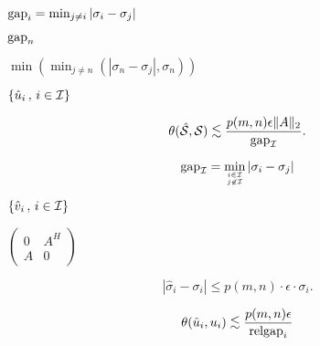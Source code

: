 {\newpage\clearpage
{}%
${\rm gap}_i = \min_{j \neq i} | \sigma_i - \sigma_j |$%
\lthtmlinlinemathZ
\lthtmlcheckvsize\clearpage}

{\newpage\clearpage
{}%
${\rm gap}_n$%
\lthtmlinlinemathZ
\lthtmlcheckvsize\clearpage}

{\newpage\clearpage
{}%
$\min ( \min_{j \neq n} ( | \sigma_n - \sigma_j | , \sigma_n ) )$%
\lthtmlinlinemathZ
\lthtmlcheckvsize\clearpage}

{\newpage\clearpage
{}%
$\{\hat{u}_i \, , \, i \in {\cal I}\}$%
\lthtmlinlinemathZ
\lthtmlcheckvsize\clearpage}

{\newpage\clearpage
{}%
\begin{displaymath}
\theta ( {\hat{\cal S}}, {\cal S}) \mathrel{\raisebox{-.75ex}{$\mathop{\sim}\limits^{\textstyle <}$}}\frac{p(m,n) \epsilon \|A\|_2}
{{\rm gap}_{\cal I}}  .
\end{displaymath}%
\lthtmldisplayZ
\lthtmlcheckvsize\clearpage}

{\newpage\clearpage
{}%
\begin{displaymath}
{\rm gap}_{\cal I} = \min_{i \in {\cal I} \atop j \not\in {\cal I}}
| \sigma_i - \sigma_j |
\end{displaymath}%
\lthtmldisplayZ
\lthtmlcheckvsize\clearpage}

{\newpage\clearpage
{}%
$\{\hat{v}_i \, , \, i \in {\cal I}\}$%
\lthtmlinlinemathZ
\lthtmlcheckvsize\clearpage}

{\newpage\clearpage
{}%
$\left( \begin{array}{cc} 0 & A^H \\A & 0 \end{array} \right) $%
\lthtmlinlinemathZ
\lthtmlcheckvsize\clearpage}

{\newpage\clearpage
{}%
\begin{displaymath}
| \hat{\sigma}_i - \sigma_i | \leq p(m,n) \cdot \epsilon \cdot \sigma_i.
\end{displaymath}%
\lthtmldisplayZ
\lthtmlcheckvsize\clearpage}

{\newpage\clearpage
{}%
\begin{displaymath}
\theta ( \hat{u}_i , u_i ) \mathrel{\raisebox{-.75ex}{$\mathop{\sim}\limits^{\textstyle <}$}}\frac{p(m,n) \epsilon}{{\rm relgap}_i}
\end{displaymath}%
\lthtmldisplayZ
\lthtmlcheckvsize\clearpage}

